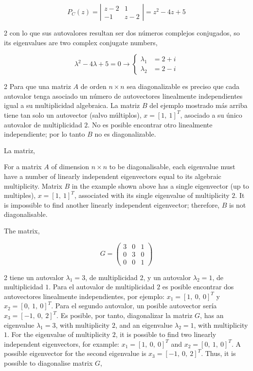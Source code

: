 \begin{equation*}
P_C(z)=\left\vert\begin{matrix}
z-2& 1\\
-1& z-2 
\end{matrix} \right\vert=z^2-4z+5
\end{equation*}
\begin{paracol}{2}
con lo que sus autovalores resultan ser dos números complejos conjugados,
\switchcolumn
so its eigenvalues are two complex conjugate numbers,
\end{paracol}
\begin{equation*}
\lambda^2-4\lambda+5=0 \rightarrow \left\{ 
\begin{aligned}
\lambda_1&=2+i\\
\lambda_2&=2-i
\end{aligned}
\right.
\end{equation*}
\begin{paracol}{2}
Para que una matriz $A$ de orden $n\times n$ sea diagonalizable es preciso que cada autovalor tenga asociado un número de autovectores linealmente independientes igual a su multiplicidad algebraica. La matriz $B$ del ejemplo mostrado más arriba tiene tan solo un autovector (salvo múltiplos), $x=[1,\ 1]^T$, asociado a su único autovalor de multiplicidad $2$. No es posible encontrar otro linealmente independiente; por lo tanto $B$ no es diagonalizable. 

La matriz,

\switchcolumn
For a matrix $A$ of dimension $n\times n$ to be diagonalisable, each eigenvalue must have a number of linearly independent eigenvectors equal to its algebraic multiplicity. Matrix $B$ in the example shown above has a single eigenvector (up to multiples), $x=[1,\ 1]^T$, associated with its single eigenvalue of multiplicity $2$. It is impossible to find another linearly independent eigenvector; therefore, $B$ is not diagonalisable.

The matrix,  
\end{paracol}
\begin{equation*}
G=\begin{pmatrix}
3& 0& 1\\
0& 3& 0\\
0& 0& 1
\end{pmatrix}
\end{equation*}
\begin{paracol}{2}
tiene un autovalor $\lambda_1=3$, de multiplicidad $2$, y un autovalor $\lambda_2=1$, de multiplicidad $1$. Para el autovalor de multiplicidad $2$ es posible encontrar dos autovectores linealmente independientes, por ejemplo: $x_1=[1,\ 0,\ 0]^T$ y $x_2=[0,\ 1,\ 0]^T$. Para el segundo autovalor, un posible autovector sería $x_3=[-1,\ 0,\ 2]^T$. Es posible, por tanto, diagonalizar la matriz $G$,
\switchcolumn
has an eigenvalue $\lambda_1=3$, with multiplicity $2$, and an eigenvalue $\lambda_2=1$, with multiplicity $1$. For the eigenvalue of multiplicity $2$, it is possible to find two linearly independent eigenvectors, for example: $x_1=[1,\ 0,\ 0]^T$ and $x_2=[0,\ 1,\ 0]^T$. A possible eigenvector for the second eigenvalue is $x_3=[-1,\ 0,\ 2]^T$. Thus, it is possible to diagonalise matrix $G$,
\end{paracol}
